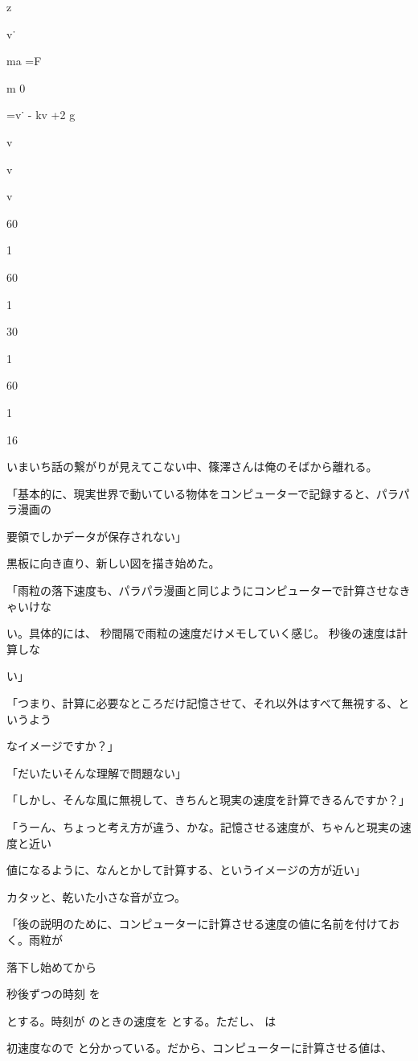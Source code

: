 z\par
v˙\par
ma =F\par
m 0\par
=v˙ - kv +2 g\par
v\par
v\par
v\par
60\par
1\par
60\par
1\par
30\par
1\par
60\par
1\par
16\par

いまいち話の繋がりが⾒えてこない中、篠澤さんは俺のそばから離れる。\par
「基本的に、現実世界で動いている物体をコンピューターで記録すると、パラパラ漫画の\par
要領でしかデータが保存されない」\par
黒板に向き直り、新しい図を描き始めた。\par
「⾬粒の落下速度も、パラパラ漫画と同じようにコンピューターで計算させなきゃいけな\par
い。具体的には、 秒間隔で⾬粒の速度だけメモしていく感じ。 秒後の速度は計算しな\par
い」\par
「つまり、計算に必要なところだけ記憶させて、それ以外はすべて無視する、というよう\par
なイメージですか？」\par
「だいたいそんな理解で問題ない」\par
「しかし、そんな⾵に無視して、きちんと現実の速度を計算できるんですか？」\par
「うーん、ちょっと考え⽅が違う、かな。記憶させる速度が、ちゃんと現実の速度と近い\par
値になるように、なんとかして計算する、というイメージの⽅が近い」\par
カタッと、乾いた⼩さな⾳が⽴つ。\par
「後の説明のために、コンピューターに計算させる速度の値に名前を付けておく。⾬粒が\par
落下し始めてから\par
秒後ずつの時刻 を\par
とする。時刻が のときの速度を とする。ただし、 は\par
初速度なので と分かっている。だから、コンピューターに計算させる値は、\par
